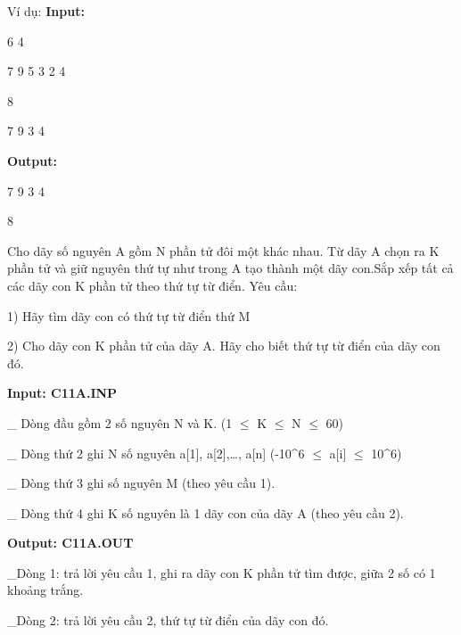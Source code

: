Ví dụ:
\textbf{    Input:   }

   6 4  

   7 9 5 3 2 4  

   8  

   7 9 3 4  



\textbf{    Output:   }



   7 9 3 4  

   8  



    Cho dãy số nguyên A gồm N phần tử đôi một khác nhau. Từ dãy A chọn ra K phần tử và giữ nguyên thứ tự như trong A tạo thành một dãy con.Sắp xếp tất cả các dãy con K phần tử theo thứ tự từ điển. Yêu cầu:   

    1) Hãy tìm dãy con có thứ tự từ điển thứ M   

    2) Cho dãy con K phần tử của dãy A. Hãy cho biết thứ tự từ điển của dãy con đó.   

\textbf{Input: C11A.INP}

    \_ Dòng đầu gồm 2 số nguyên N và K. (1  $\le$  K  $\le$  N  $\le$  60)   

    \_ Dòng thứ 2 ghi N số nguyên a[1], a[2],…, a[n] (-10^6  $\le$  a[i]  $\le$  10^6)   

    \_ Dòng thứ 3 ghi số nguyên M (theo yêu cầu 1).   

    \_ Dòng thứ 4 ghi K số nguyên là 1 dãy con của dãy A (theo yêu cầu 2).   

\textbf{Output: C11A.OUT}

    \_Dòng 1: trả lời yêu cầu 1, ghi ra dãy con K phần tử tìm được, giữa 2 số có 1 khoảng trắng.   

    \_Dòng 2: trả lời yêu cầu 2, thứ tự từ điển của dãy con đó.
